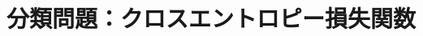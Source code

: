 \documentclass[../../../topic_machine-learning]{subfiles}
\begin{document}
\sectionline
\section{分類問題：クロスエントロピー損失関数}

\todo{}
\end{document}

